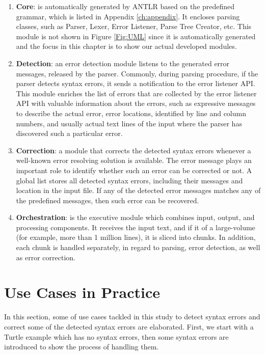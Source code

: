 \begin{enumerate}[]
 \item \textbf {Core}: is automatically generated by ANTLR based on the predefined grammar, which is listed in Appendix \ref{ch:appendix}. 
 It encloses parsing classes, such as Parser, Lexer, Error Listener, Parse Tree Creator, etc. This module is not shown in Figure \ref{Fig:UML} since it is automatically generated and the focus in this chapter is to show our actual developed modules. 
\item \textbf{Detection}: an error detection module listens to the generated error messages, released by the parser. 
Commonly, during parsing procedure, if the parser detects syntax errors, it sends a notification to the error listener API. 
This module enriches the list of errors that are collected by the error listener API with valuable information about the errors, such as  expressive messages to describe the actual error,  error locations, identified by line and column numbers, and usually  actual text lines  of the input where the parser has discovered such a particular error.

\item \textbf {Correction}: a module that corrects the detected syntax errors whenever a well-known error resolving solution is available. 
The error message plays an important role to identify whether such an error can be corrected or not. 
A global list stores all detected syntax errors, including their messages and location in the input file. 
If any of the detected error messages matches any of the predefined messages, then such error can be recovered.

\item \textbf{Orchestration}: %
is the executive module which combines input, output, and processing components. 
It receives the input text, and if it of a large-volume (for example, more than 1 million lines), it is sliced into  chunks. In addition, each chunk is handled separately, in regard to parsing, error detection, as well as error correction.

\end{enumerate} 


\section{Use Cases in Practice}
In this section, some of use cases tackled in this study to detect syntax errors and correct some of the detected syntax errors are elaborated. 
First, we start with a Turtle example which has no syntax errors, then some syntax errors are introduced to show the process of handling them. 


